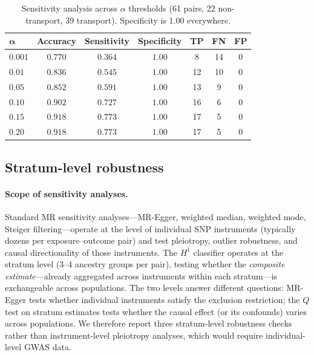 \documentclass[11pt]{article}
\begin{document}
\begin{table}[t]
\centering
\caption{Sensitivity analysis across $\alpha$ thresholds (61 pairs, 22 non-transport, 39 transport). Specificity is 1.00 everywhere.}
\label{tab:realdata-sensitivity}
\small
\begin{tabular}{@{}lcccccc@{}}
\toprule
$\boldsymbol{\alpha}$ & \textbf{Accuracy} & \textbf{Sensitivity} & \textbf{Specificity} & \textbf{TP} & \textbf{FN} & \textbf{FP} \\
\midrule
$0.001$ & $0.770$ & $0.364$ & $1.00$ & 8 & 14 & 0 \\
$0.01$ & $0.836$ & $0.545$ & $1.00$ & 12 & 10 & 0 \\
$0.05$ & $0.852$ & $0.591$ & $1.00$ & 13 & 9 & 0 \\
$0.10$ & $\mathbf{0.902}$ & $\mathbf{0.727}$ & $\mathbf{1.00}$ & 16 & 6 & 0 \\
$0.15$ & $0.918$ & $0.773$ & $1.00$ & 17 & 5 & 0 \\
$0.20$ & $0.918$ & $0.773$ & $1.00$ & 17 & 5 & 0 \\
\bottomrule
\end{tabular}
\end{table}

\subsection{Stratum-level robustness}
\label{sec:realdata-stratum-robustness}

\paragraph{Scope of sensitivity analyses.}
Standard MR sensitivity analyses---MR-Egger, weighted median, weighted mode, Steiger filtering---operate at the level of individual SNP instruments (typically dozens per exposure--outcome pair) and test pleiotropy, outlier robustness, and causal directionality of those instruments.
The $H^1$ classifier operates at the stratum level (3--4 ancestry groups per pair), testing whether the \emph{composite estimate}---already aggregated across instruments within each stratum---is exchangeable across populations.
The two levels answer different questions: MR-Egger tests whether individual instruments satisfy the exclusion restriction; the $Q$ test on stratum estimates tests whether the causal effect (or its confounds) varies across populations.
We therefore report three stratum-level robustness checks rather than instrument-level pleiotropy analyses, which would require individual-level GWAS data.
\end{document}
